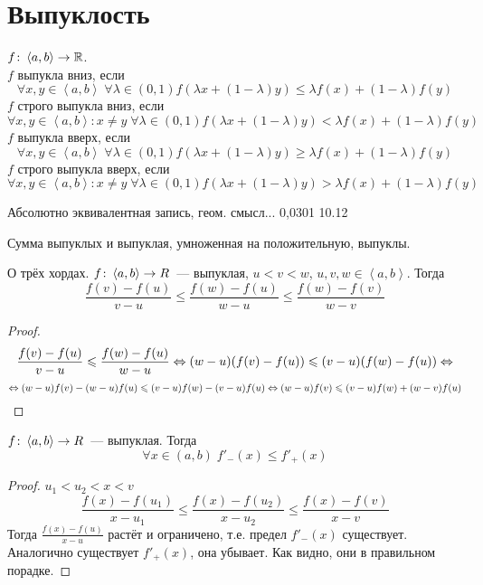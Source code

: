 \section{Выпуклость}

\begin{Def}
$f\colon \left<a, b\right> \rightarrow \mathbb{R}$. \\
$f$ выпукла вниз, если 
$$\forall x, y \in \left<a, b\right>\; \forall \lambda \in (0, 1) f(\lambda x + (1-\lambda)y) \leqslant \lambda f(x) + (1-\lambda) f(y)$$
$f$ строго выпукла вниз, если 
$$\forall x, y \in \left<a, b\right>\colon x \ne y\; \forall \lambda \in (0, 1) f(\lambda x + (1-\lambda)y) < \lambda f(x) + (1-\lambda) f(y)$$
$f$ выпукла вверх, если 
$$\forall x, y \in \left<a, b\right>\; \forall \lambda \in (0, 1) f(\lambda x + (1-\lambda)y) \geqslant \lambda f(x) + (1-\lambda) f(y)$$
$f$ строго выпукла вверх, если 
$$\forall x, y \in \left<a, b\right>\colon x \ne y\; \forall \lambda \in (0, 1) f(\lambda x + (1-\lambda)y) > \lambda f(x) + (1-\lambda) f(y)$$
\end{Def}
Абсолютно эквивалентная запись, геом. смысл...	0,0301
10.12	

\begin{Rem}
Сумма выпуклых и выпуклая, умноженная на положительную, выпуклы.
\end{Rem}

\begin{lemma}
О трёх хордах. $f\colon \left<a, b\right> \rightarrow R$~--- выпуклая, $u < v < w$, $u,v,w \in \left<a, b\right>$. Тогда
$$\frac{f(v) - f(u)}{v - u} \leqslant \frac{f(w) - f(u)}{w-u} \leqslant \frac{f(w) - f(v)}{w-v}$$
\end{lemma}
\begin{proof}
$$\frac{f(v) - f(u)}{v - u} \leqslant \frac{f(w) - f(u)}{w-u} \Leftrightarrow (w-u)(f(v) - f(u)) \leqslant (v-u)(f(w) - f(u)) \Leftrightarrow$$
$$\Leftrightarrow (w-u)f(v) - (w-u)f(u) \leqslant (v-u)f(w) - (v-u)f(u) \Leftrightarrow (w-u)f(v) \leqslant (v-u)f(w) + (w-v)f(u)$$
\end{proof}

\begin{theorem}{}
$f\colon \left<a, b\right> \rightarrow R$~--- выпуклая. Тогда 
$$\forall x \in (a, b)\; f'_-(x) \leqslant f'_+(x)$$
\end{theorem}
\begin{proof}
$u_1 < u_2 < x < v$
$$\frac{f(x)-f(u_1)}{x-u_1} \leqslant \frac{f(x)-f(u_2)}{x-u_2} \leqslant \frac{f(x)-f(v)}{x-v}$$
Тогда $\frac{f(x)-f(u)}{x-u}$ растёт и ограничено, т.е. предел $f'_-(x)$ существует.
Аналогично существует $f'_+(x)$, она убывает. Как видно, они в правильном порадке.
\end{proof}

